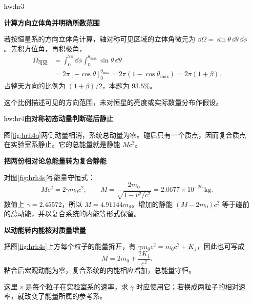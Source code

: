 \begin{drillsolution}{hw:hr3}
\par\medskip{}\noindent\textbf{计算方向立体角并明确所数范围}\par\nobreak
若按恒星系的方向立体角计算，轴对称可见区域的立体角微元为
$\dd\Omega=\sin\theta\,\dd\theta\,\dd\phi$。先积方位角，再积极角，
\begin{align*}
 \Omega_{\text{可见}}
 &=\int_0^{2\pi}\dd\phi\int_0^{\theta_{\max}}\sin\theta\,\dd\theta\\
 &=2\pi[-\cos\theta]_0^{\theta_{\max}}
 =2\pi(1-\cos\theta_{\max})=2\pi(1+\beta).
\end{align*}
占整天方向的比例为 $(1+\beta)/2$，本题为 $93.5\%$。

这个比例描述可见的方向范围，未对恒星的亮度或实际数量分布作假设。

\end{drillsolution}

\begin{drillsolution}{hw:hr4}\textbf{由对称初态动量判断碰后静止}\par\nobreak
图\ref{fig:hrh4q}两侧动量相消，系统总动量为零。碰后只有一个质点，因而复合质点在实验室系静止。它的总能量就是静能 $Mc^2$。


\par\medskip{}\noindent\textbf{把两份相对论总能量转为复合静能}\par\nobreak
对图\ref{fig:hrh4s}写能量守恒式：
\[
Mc^2=2\gamma m_0c^2,\qquad
\boxed{M=\frac{2m_0}{\sqrt{1-v^2/c^2}}
 =2.0677\times10^{-26}\,\mathrm{kg}}.
\]
数值上 $\gamma=2.45572$，所以 $M=4.91144m_0$。增加的静能 $(M-2m_0)c^2$ 等于碰前的总动能，并以复合系统的内能等形式保留。


\par\medskip{}\noindent\textbf{以动能转内能核对质量增量}\par\nobreak
把图\ref{fig:hrh4s}上方每个粒子的能量拆开，有 $\gamma m_0c^2=m_0c^2+K_1$，因此也可写成
\[
M=2m_0+\frac{2K_1}{c^2}.
\]
粘合后宏观动能为零，复合系统的内能相应增加，总能量守恒。

这里 $v$ 是每个粒子在实验室系的速率，求 $\gamma$ 时应使用它；若换成两粒子的相对速率，就改变了能量所属的参考系。

\end{drillsolution}

